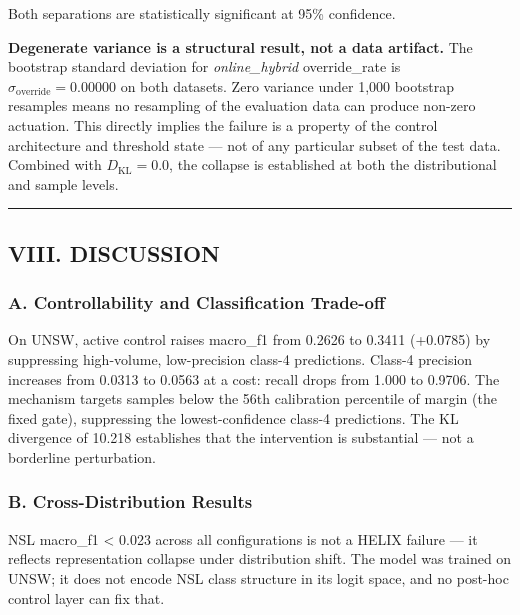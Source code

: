 \documentclass[
  conference]{IEEEtran}
\begin{document}
Both separations are statistically significant at 95\% confidence.

\textbf{Degenerate variance is a structural result, not a data
artifact.} The bootstrap standard deviation for \emph{online\_hybrid}
override\_rate is \(\sigma_{\text{override}} = 0.00000\) on both
datasets. Zero variance under 1,000 bootstrap resamples means no
resampling of the evaluation data can produce non-zero actuation. This
directly implies the failure is a property of the control architecture
and threshold state --- not of any particular subset of the test data.
Combined with \(D_{\text{KL}} = 0.0\), the collapse is established at
both the distributional and sample levels.

\begin{center}\rule{0.5\linewidth}{0.5pt}\end{center}

\subsection{VIII. DISCUSSION}\label{viii.-discussion}

\subsubsection{A. Controllability and Classification
Trade-off}\label{a.-controllability-and-classification-trade-off}

On UNSW, active control raises macro\_f1 from 0.2626 to 0.3411 (+0.0785)
by suppressing high-volume, low-precision class-4 predictions. Class-4
precision increases from 0.0313 to 0.0563 at a cost: recall drops from
1.000 to 0.9706. The mechanism targets samples below the 56th
calibration percentile of margin (the fixed gate), suppressing the
lowest-confidence class-4 predictions. The KL divergence of 10.218
establishes that the intervention is substantial --- not a borderline
perturbation.

\subsubsection{B. Cross-Distribution
Results}\label{b.-cross-distribution-results}

NSL macro\_f1 \textless{} 0.023 across all configurations is not a HELIX
failure --- it reflects representation collapse under distribution
shift. The model was trained on UNSW; it does not encode NSL class
structure in its logit space, and no post-hoc control layer can fix
that.
\end{document}
